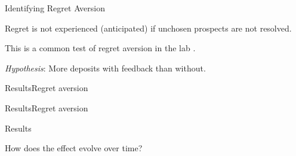 \documentclass[aspectratio=169]{beamer}
\newenvironment{wideitemize}{\itemize\addtolength{\itemsep}{10pt}}{\enditemize}
\begin{document}
\begin{frame}{Identifying Regret Aversion}

	\begin{wideitemize}

		\item Regret is not experienced (anticipated) if unchosen prospects are not resolved.

		\item This is a common test of regret aversion in the lab \parencite{filiz-ozbay_auctions_2007,zeelenberg_consequences_2004}.

	





		\item \textit{Hypothesis}: More deposits with feedback than without.

	\end{wideitemize}

	
\end{frame}

\begin{frame}{Results}{Regret aversion}

	

\end{frame}

\begin{frame}{Results}{Regret aversion}


\end{frame}

\begin{frame}{Results}
	
	\centering \large How does the effect evolve over time?

\end{frame}
\end{document}
